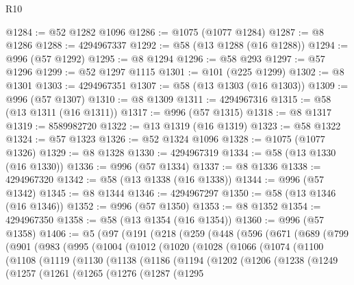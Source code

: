 \begin{lexlean}{R10}
\begin{coremodule}
@1284 := @52 @1282 @1096
@1286 := @1075 (@1077 @1284)
@1287 := @8 @1286
@1288 := 4294967337
@1292 := @58 (@13 @1288 (@16 @1288))
@1294 := @996 (@57 @1292)
@1295 := @8 @1294
@1296 := @58 @293
@1297 := @57 @1296
@1299 := @52 @1297 @1115
@1301 := @101 (@225 @1299)
@1302 := @8 @1301
@1303 := 4294967351
@1307 := @58 (@13 @1303 (@16 @1303))
@1309 := @996 (@57 @1307)
@1310 := @8 @1309
@1311 := 4294967316
@1315 := @58 (@13 @1311 (@16 @1311))
@1317 := @996 (@57 @1315)
@1318 := @8 @1317
@1319 := 8589982720
@1322 := @13 @1319 (@16 @1319)
@1323 := @58 @1322
@1324 := @57 @1323
@1326 := @52 @1324 @1096
@1328 := @1075 (@1077 @1326)
@1329 := @8 @1328
@1330 := 4294967319
@1334 := @58 (@13 @1330 (@16 @1330))
@1336 := @996 (@57 @1334)
@1337 := @8 @1336
@1338 := 4294967320
@1342 := @58 (@13 @1338 (@16 @1338))
@1344 := @996 (@57 @1342)
@1345 := @8 @1344
@1346 := 4294967297
@1350 := @58 (@13 @1346 (@16 @1346))
@1352 := @996 (@57 @1350)
@1353 := @8 @1352
@1354 := 4294967350
@1358 := @58 (@13 @1354 (@16 @1354))
@1360 := @996 (@57 @1358)
@1406 := @5
    (@97
      (@191
        (@218
          (@259
            (@448
              (@596
                (@671
                  (@689
                    (@799
                      (@901
                        (@983
                          (@995
                            (@1004
                              (@1012
                                (@1020
                                  (@1028
                                    (@1066
                                      (@1074
                                        (@1100
                                          (@1108
                                            (@1119
                                              (@1130
                                                (@1138
                                                  (@1186
                                                    (@1194
                                                      (@1202
                                                        (@1206
                                                          (@1238
                                                            (@1249
                                                              (@1257
                                                                (@1261
                                                                  (@1265
                                                                    (@1276
                                                                      (@1287
                                                                        (@1295

\end{coremodule}
\end{lexlean}
